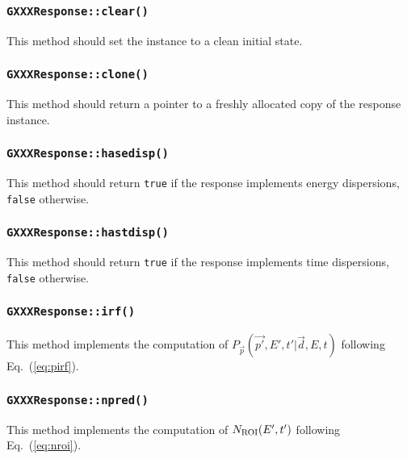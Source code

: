 \documentclass{article}[12pt,a4]
\begin{document}
\subsubsection{{\tt GXXXResponse::clear()}}

This method should set the instance to a clean initial state.


\subsubsection{{\tt GXXXResponse::clone()}}

This method should return a pointer to a freshly allocated copy of the response instance.


\subsubsection{{\tt GXXXResponse::hasedisp()}}

This method should return {\tt true} if the response implements energy dispersions, {\tt false}
otherwise.


\subsubsection{{\tt GXXXResponse::hastdisp()}}

This method should return {\tt true} if the response implements time dispersions, {\tt false}
otherwise.


\subsubsection{{\tt GXXXResponse::irf()}}
\label{sec:GXXXResponse::irf}

This method implements the computation of $P_{\vec{p}}(\vec{p'}, E', t' | \vec{d}, E, t)$
following Eq.~(\ref{eq:pirf}).


\subsubsection{{\tt GXXXResponse::npred()}}

This method implements the computation of $N_{\rm ROI}(E', t')$
following Eq.~(\ref{eq:nroi}).
\end{document}
